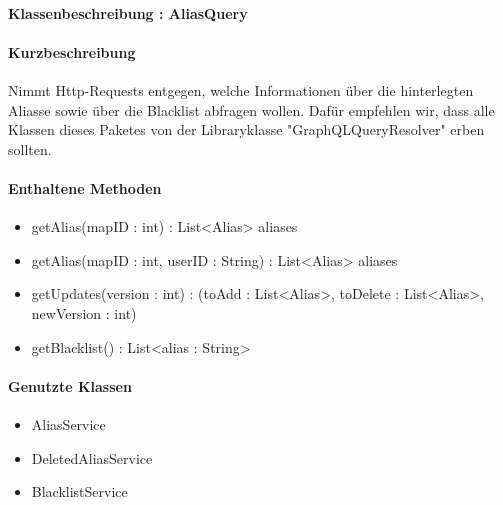 \paragraph{Klassenbeschreibung : AliasQuery}%
\paragraph*{Kurzbeschreibung}
Nimmt Http-Requests entgegen, welche Informationen über die hinterlegten Aliasse sowie über die Blacklist abfragen wollen.
Dafür empfehlen wir, dass alle Klassen dieses Paketes von der Libraryklasse "GraphQLQueryResolver" erben sollten.
\paragraph*{Enthaltene Methoden}
\begin{itemize}
    \item getAlias(mapID : int) : List<Alias> aliases
    \item getAlias(mapID : int, userID : String) : List<Alias> aliases
    \item getUpdates(version : int) : (toAdd : List<Alias>, toDelete : List<Alias>, newVersion : int)
    \item getBlacklist() : List<alias : String>
\end{itemize}
\paragraph*{Genutzte Klassen}
\begin{itemize}
    \item AliasService
    \item DeletedAliasService
    \item BlacklistService
\end{itemize}